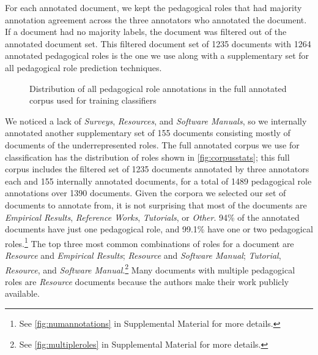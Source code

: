 \documentclass[11pt,a4paper]{article}
\begin{document}
For each annotated document, we kept the pedagogical roles that had majority annotation agreement across the three annotators who annotated the document. If a document had no majority labels, the document was filtered out of the annotated document set. This filtered document set of 1235 documents with 1264 annotated pedagogical roles is the one we use along with a supplementary set for all pedagogical role prediction techniques.

\begin{figure}[ht]
    \caption{Distribution of all pedagogical role annotations in the full annotated corpus used for training classifiers}
  	\label{fig:corpusstats}
\end{figure}

We noticed a lack of \textit{Surveys}, \textit{Resources}, and \textit{Software Manuals}, so we internally annotated another supplementary set of 155 documents consisting mostly of documents of the underrepresented roles. The full annotated corpus we use for classification has the distribution of roles shown in \autoref{fig:corpusstats}; this full corpus includes the filtered set of 1235 documents annotated by three annotators each and 155 internally annotated documents, for a total of 1489 pedagogical role annotations over 1390 documents. Given the corpora we selected our set of documents to annotate from, it is not surprising that most of the documents are \textit{Empirical Results}, \textit{Reference Works}, \textit{Tutorials}, or \textit{Other}. 94\% of the annotated documents have just one pedagogical role, and 99.1\% have one or two pedagogical roles.\footnote{See \autoref{fig:numannotations} in Supplemental Material for more details.} The top three most common combinations of roles for a document are \textit{Resource} and \textit{Empirical Results}; \textit{Resource} and \textit{Software Manual}; \textit{Tutorial}, \textit{Resource}, and \textit{Software Manual}.\footnote{See \autoref{fig:multipleroles} in Supplemental Material for more details.} Many documents with multiple pedagogical roles are \textit{Resource} documents because the authors make their work publicly available.
\end{document}
